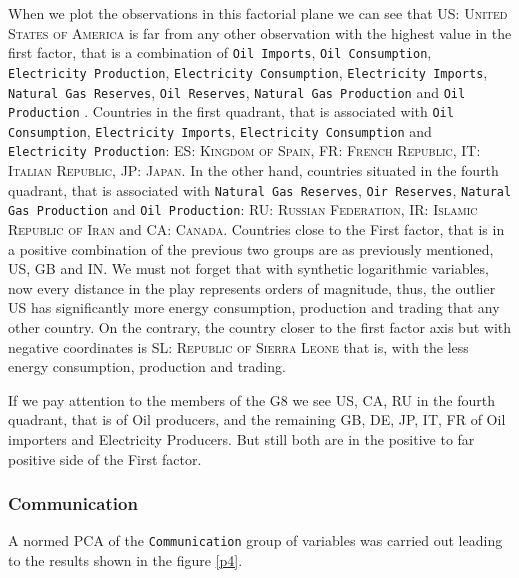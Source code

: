 \documentclass[a4paper,10pt,twocolumn]{article}
\begin{document}
When we plot the observations in this factorial plane we can see that \textsc{US: United States of America} is far from any other observation with the highest value in the first factor, that is a combination of \texttt{Oil Imports}, \texttt{Oil Consumption}, \texttt{Electricity Production}, \texttt{Electricity Consumption}, \texttt{Electricity Imports}, \texttt{Natural Gas Reserves}, \texttt{Oil Reserves}, \texttt{Natural Gas Production} and \texttt{Oil Production} . Countries in the first quadrant, that is associated with \texttt{Oil Consumption}, \texttt{Electricity Imports}, \texttt{Electricity Consumption} and \texttt{Electricity Production}: \textsc{ES: Kingdom of Spain}, \textsc{FR: French Republic}, \textsc{IT: Italian Republic}, \textsc{JP: Japan}. In the other hand, countries situated in the fourth quadrant, that is associated with \texttt{Natural Gas Reserves}, \texttt{Oir Reserves}, \texttt{Natural Gas Production} and \texttt{Oil Production}: \textsc{RU: Russian Federation}, \textsc{IR: Islamic Republic of Iran} and \textsc{CA: Canada}. Countries close to the First factor, that is in a positive combination of the previous two groups are as previously mentioned, \textsc{US}, \textsc{GB} and \textsc{IN}. We must not forget that with synthetic logarithmic variables, now every distance in the play represents orders of magnitude, thus, the outlier \textsc{US} has significantly more energy consumption, production and trading that any other country.  On the contrary, the country closer to the first factor axis but with negative coordinates is \textsc{SL: Republic of Sierra Leone} that is, with the less energy consumption, production and trading. 

If we pay attention to the members of the \textsc{G8} we see \textsc{US, CA, RU} in the fourth quadrant, that is of Oil producers, and the remaining \textsc{GB, DE, JP, IT, FR} of Oil importers and Electricity Producers. But still both are in the positive to far positive side of the First factor.

\subsubsection{Communication}
A normed PCA of the \texttt{Communication} group of variables was carried out leading to the results shown in the figure \ref{p4}. 
\end{document}
